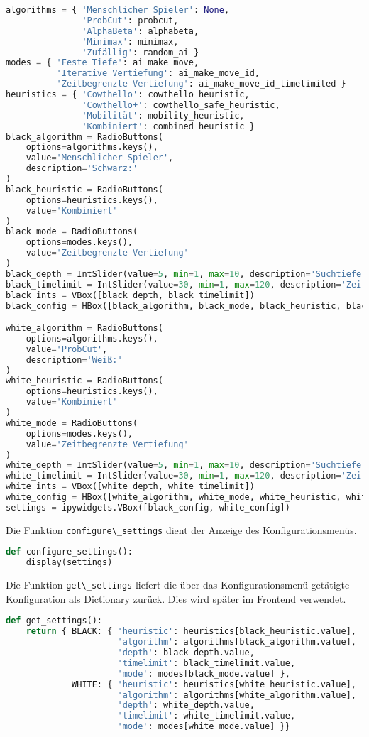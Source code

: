 \begin{lstlisting}[language=Python]
algorithms = { 'Menschlicher Spieler': None,
               'ProbCut': probcut,
               'AlphaBeta': alphabeta,
               'Minimax': minimax,
               'Zufällig': random_ai }
modes = { 'Feste Tiefe': ai_make_move,
          'Iterative Vertiefung': ai_make_move_id,
          'Zeitbegrenzte Vertiefung': ai_make_move_id_timelimited }
heuristics = { 'Cowthello': cowthello_heuristic,
               'Cowthello+': cowthello_safe_heuristic,
               'Mobilität': mobility_heuristic,
               'Kombiniert': combined_heuristic }
black_algorithm = RadioButtons(
    options=algorithms.keys(),
    value='Menschlicher Spieler',
    description='Schwarz:'
)
black_heuristic = RadioButtons(
    options=heuristics.keys(),
    value='Kombiniert'
)
black_mode = RadioButtons(
    options=modes.keys(),
    value='Zeitbegrenzte Vertiefung'
)
black_depth = IntSlider(value=5, min=1, max=10, description='Suchtiefe:')
black_timelimit = IntSlider(value=30, min=1, max=120, description='Zeitlimit:')
black_ints = VBox([black_depth, black_timelimit])
black_config = HBox([black_algorithm, black_mode, black_heuristic, black_ints])

white_algorithm = RadioButtons(
    options=algorithms.keys(),
    value='ProbCut',
    description='Weiß:'
)
white_heuristic = RadioButtons(
    options=heuristics.keys(),
    value='Kombiniert'
)
white_mode = RadioButtons(
    options=modes.keys(),
    value='Zeitbegrenzte Vertiefung'
)
white_depth = IntSlider(value=5, min=1, max=10, description='Suchtiefe:')
white_timelimit = IntSlider(value=30, min=1, max=120, description='Zeitlimit:')
white_ints = VBox([white_depth, white_timelimit])
white_config = HBox([white_algorithm, white_mode, white_heuristic, white_ints])
settings = ipywidgets.VBox([black_config, white_config])
\end{lstlisting}

Die Funktion \passthrough{\lstinline!configure\_settings!} dient der
Anzeige des Konfigurationsmenüs.

\begin{lstlisting}[language=Python]
def configure_settings():
    display(settings)
\end{lstlisting}

Die Funktion \passthrough{\lstinline!get\_settings!} liefert die über
das Konfigurationsmenü getätigte Konfiguration als Dictionary zurück.
Dies wird später im Frontend verwendet.

\begin{lstlisting}[language=Python]
def get_settings():
    return { BLACK: { 'heuristic': heuristics[black_heuristic.value],
                      'algorithm': algorithms[black_algorithm.value],
                      'depth': black_depth.value,
                      'timelimit': black_timelimit.value,
                      'mode': modes[black_mode.value] },
             WHITE: { 'heuristic': heuristics[white_heuristic.value],
                      'algorithm': algorithms[white_algorithm.value],
                      'depth': white_depth.value,
                      'timelimit': white_timelimit.value,
                      'mode': modes[white_mode.value] }}
\end{lstlisting}
